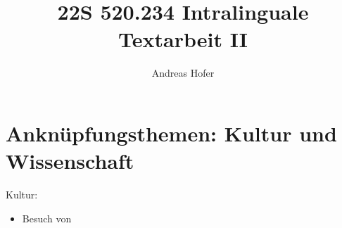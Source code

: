 \documentclass{article}
\title{22S 520.234 Intralinguale Textarbeit II}
\author{Andreas Hofer}
\begin{document}
	\maketitle
	\section{Anknüpfungsthemen: Kultur und Wissenschaft}
	Kultur:
	\begin{itemize}
		\item{Besuch von}
	\end{itemize}
	
\end{document}
